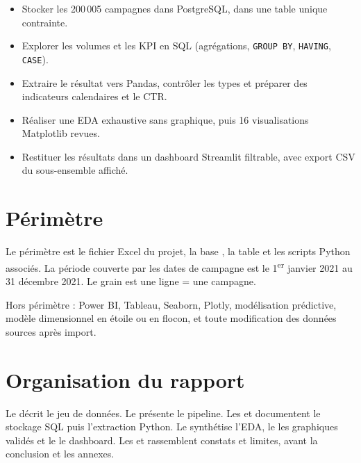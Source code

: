 \begin{objectives}
\begin{itemize}
\item Stocker les 200\,005 campagnes dans PostgreSQL, dans une table unique contrainte.
\item Explorer les volumes et les KPI en SQL (agrégations, \texttt{GROUP BY}, \texttt{HAVING}, \texttt{CASE}).
\item Extraire le résultat vers Pandas, contrôler les types et préparer des indicateurs calendaires et le CTR.
\item Réaliser une EDA exhaustive sans graphique, puis 16 visualisations Matplotlib revues.
\item Restituer les résultats dans un dashboard Streamlit filtrable, avec export CSV du sous-ensemble affiché.
\end{itemize}
\end{objectives}

\section{Périmètre}

Le périmètre est le fichier Excel du projet, la base , la table  et les scripts Python associés. La période couverte par les dates de campagne est le 1\textsuperscript{er} janvier 2021 au 31 décembre 2021. Le grain est une ligne = une campagne.

Hors périmètre : Power BI, Tableau, Seaborn, Plotly, modélisation prédictive, modèle dimensionnel en étoile ou en flocon, et toute modification des données sources après import.

\section{Organisation du rapport}

Le  décrit le jeu de données. Le  présente le pipeline. Les  et  documentent le stockage SQL puis l'extraction Python. Le  synthétise l'EDA, le  les graphiques validés et le  le dashboard. Les  et  rassemblent constats et limites, avant la conclusion et les annexes.
